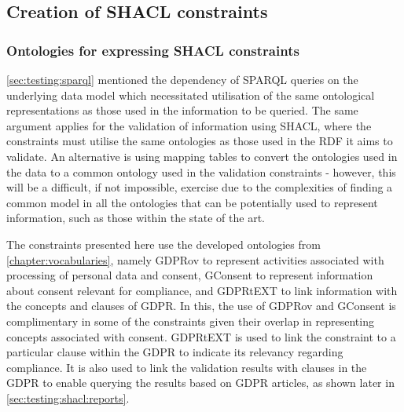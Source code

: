 \subsection{Creation of SHACL constraints}\label{sec:testing:shacl:constraints}
\subsubsection{Ontologies for expressing SHACL constraints}
\autoref{sec:testing:sparql} mentioned the dependency of SPARQL queries on the underlying data model which necessitated utilisation of the same ontological representations as those used in the information to be queried.
The same argument applies for the validation of information using SHACL, where the constraints must utilise the same ontologies as those used in the RDF it aims to validate.
An alternative is using mapping tables to convert the ontologies used in the data to a common ontology used in the validation constraints - however, this will be a difficult, if not impossible, exercise due to the complexities of finding a common model in all the ontologies that can be potentially used to represent information, such as those within the state of the art.

The constraints presented here use the developed ontologies from \autoref{chapter:vocabularies}, namely GDPRov to represent activities associated with processing of personal data and consent, GConsent to represent information about consent relevant for compliance, and GDPRtEXT to link information with the concepts and clauses of GDPR.
In this, the use of GDPRov and GConsent is complimentary in some of the constraints given their overlap in representing concepts associated with consent.
GDPRtEXT is used to link the constraint to a particular clause within the GDPR to indicate its relevancy regarding compliance. It is also used to link the validation results with clauses in the GDPR to enable querying the results based on GDPR articles, as shown later in \autoref{sec:testing:shacl:reports}.

